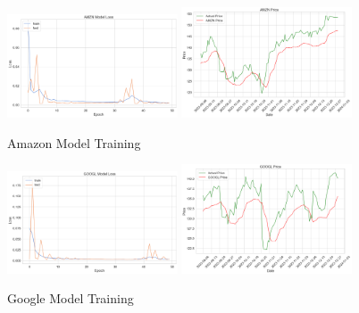 \documentclass{ledger}
\begin{document}
\begin{figure}[htbp]
    \centering
    \includegraphics[width=0.45\textwidth]{code/price-prediction/lstm/images/amzn_loss.png} %
    \hspace{0.05\textwidth} %
    \includegraphics[width=0.45\textwidth]{code/price-prediction/lstm/images/amzn_price.png} %
    \caption{Amazon Model Training}
    \label{fig:side_by_side}
\end{figure}

\begin{figure}[htbp]
    \centering
    \includegraphics[width=0.45\textwidth]{code/price-prediction/lstm/images/googl_loss.png} %
    \hspace{0.05\textwidth} %
    \includegraphics[width=0.45\textwidth]{code/price-prediction/lstm/images/googl_price.png} %
    \caption{Google Model Training}
    \label{fig:side_by_side}
\end{figure}
\end{document}
